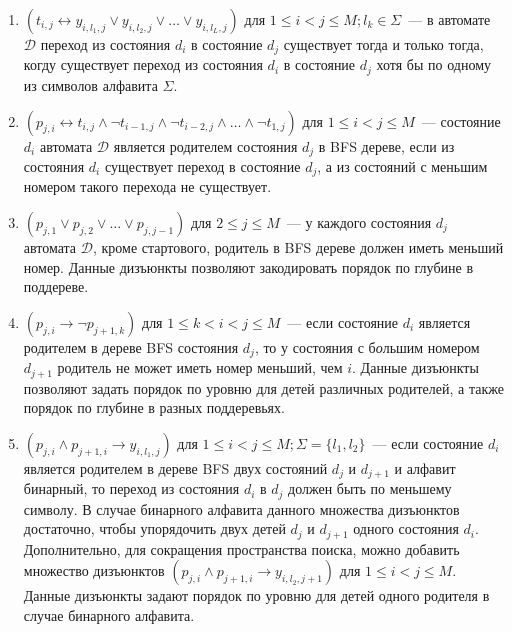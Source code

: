\begin{enumerate}
  \item $\left(t_{i,j} \leftrightarrow y_{i,l_{1},j} \vee y_{i,l_{2},j} \vee \ldots \vee y_{i,l_{L},j} \right)$ для $1 \leq i < j \leq M; l_{k} \in \Sigma$~--- в автомате $\mathcal{D}$ переход из состояния $d_{i}$ в состояние $d_{j}$ существует тогда и только тогда, когду существует переход из состояния $d_{i}$ в состояние $d_{j}$ хотя бы по одному из символов алфавита $\Sigma$.
  
  \item $\left(p_{j,i} \leftrightarrow t_{i,j} \wedge \neg t_{i - 1,j} \wedge \neg t_{i - 2, j} \wedge \ldots \wedge \neg t_{1,j}\right)$ для $1 \leq i < j \leq M$~{---} состояние $d_{i}$ автомата $\mathcal{D}$ является родителем состояния $d_{j}$ в BFS дереве, если из состояния $d_{i}$ существует переход в состояние $d_{j}$, а из состояний с меньшим номером такого перехода не существует.
  
  \item $\left(p_{j,1} \vee p_{j,2} \vee \ldots \vee p_{j,j - 1}\right)$ для $2 \leq j \leq M$~{---} у каждого состояния $d_{j}$ автомата $\mathcal{D}$, кроме стартового, родитель в BFS дереве должен иметь меньший номер. 
  Данные дизъюнкты позволяют закодировать порядок по глубине в поддереве.

  \item $\left(p_{j,i} \rightarrow \neg p_{j + 1, k}\right)$ для $1 \leq k < i < j \leq M$~{---} если состояние $d_{i}$ является родителем в дереве BFS состояния $d_{j}$, то у состояния с б\emph{о}льшим номером $d_{j + 1}$ родитель не может иметь номер меньший, чем $i$. 
  Данные дизъюнкты позволяют задать порядок по уровню для детей различных родителей, а также порядок по глубине в разных поддеревьях.
  
  \item $\left(p_{j,i} \wedge p_{j + 1, i} \rightarrow y_{i,l_{1},j}\right)$ для $1 \leq i < j \leq M;\Sigma=\{l_{1},l_{2}\}$~{---} если состояние $d_i$ является родителем в дереве BFS двух состояний $d_{j}$ и $d_{j+1}$ и алфавит бинарный, то переход из состояния $d_{i}$ в $d_{j}$ должен быть по меньшему символу.
  В случае бинарного алфавита данного множества дизъюнктов достаточно, чтобы упорядочить двух детей $d_{j}$ и $d_{j + 1}$ одного состояния $d_{i}$. 
  Дополнительно, для сокращения пространства поиска, можно добавить множество дизъюнктов $\left(p_{j,i} \wedge p_{j + 1, i} \rightarrow y_{i,l_{2},j + 1}\right)$ для $1 \leq i < j \leq M$. 
  Данные дизъюнкты задают порядок по уровню для детей одного родителя в случае бинарного алфавита.


\end{enumerate}
